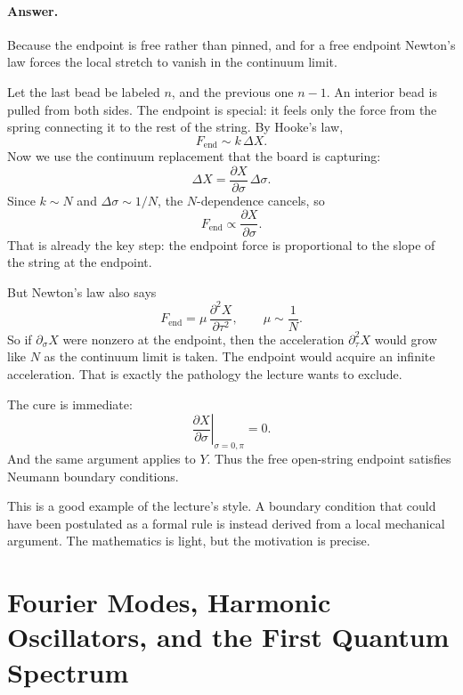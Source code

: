 \paragraph{Answer.}
Because the endpoint is free rather than pinned, and for a free endpoint Newton's law forces the local stretch to vanish in the continuum limit.

Let the last bead be labeled \(n\), and the previous one \(n-1\). An interior bead is pulled from both sides. The endpoint is special: it feels only the force from the spring connecting it to the rest of the string. By Hooke's law,
\begin{equation}
F_{\mathrm{end}}\sim k\,\Delta X.
\end{equation}
Now we use the continuum replacement that the board is capturing:
\begin{equation}
\Delta X=\frac{\partial X}{\partial \sigma}\,\Delta \sigma.
\end{equation}
Since \(k\sim N\) and \(\Delta \sigma\sim 1/N\), the \(N\)-dependence cancels, so
\begin{equation}
F_{\mathrm{end}}\propto \frac{\partial X}{\partial \sigma}.
\end{equation}
That is already the key step: the endpoint force is proportional to the slope of the string at the endpoint.

But Newton's law also says
\begin{equation}
F_{\mathrm{end}}=\mu\,\frac{\partial^2 X}{\partial \tau^2},
\qquad
\mu\sim \frac{1}{N}.
\end{equation}
So if \(\partial_\sigma X\) were nonzero at the endpoint, then the acceleration \(\partial_\tau^2 X\) would grow like \(N\) as the continuum limit is taken. The endpoint would acquire an infinite acceleration. That is exactly the pathology the lecture wants to exclude.

The cure is immediate:
\begin{equation}
\left.\frac{\partial X}{\partial \sigma}\right|_{\sigma=0,\pi}=0.
\end{equation}
And the same argument applies to \(Y\). Thus the free open-string endpoint satisfies Neumann boundary conditions.

This is a good example of the lecture's style. A boundary condition that could have been postulated as a formal rule is instead derived from a local mechanical argument. The mathematics is light, but the motivation is precise.

\section{Fourier Modes, Harmonic Oscillators, and the First Quantum Spectrum}

